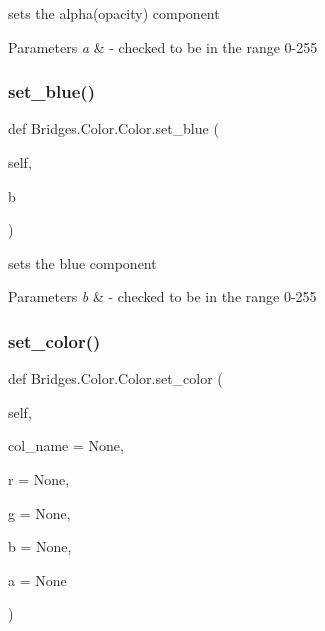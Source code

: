 sets the alpha(opacity) component 


\begin{DoxyParams}{Parameters}
{\em a} & -\/ checked to be in the range 0-\/255 \\
\hline
\end{DoxyParams}
\mbox{\label{class_bridges_1_1_color_1_1_color_a5b298c7b23b82e2599377ec79f199362}} 
\subsubsection{\texorpdfstring{set\+\_\+blue()}{set\_blue()}}
{\footnotesize\ttfamily def Bridges.\+Color.\+Color.\+set\+\_\+blue (\begin{DoxyParamCaption}\item[{}]{self,  }\item[{}]{b }\end{DoxyParamCaption})}



sets the blue component 


\begin{DoxyParams}{Parameters}
{\em b} & -\/ checked to be in the range 0-\/255 \\
\hline
\end{DoxyParams}
\mbox{\label{class_bridges_1_1_color_1_1_color_abb49cdb739a55e982a4080bfa761a701}} 
\subsubsection{\texorpdfstring{set\+\_\+color()}{set\_color()}}
{\footnotesize\ttfamily def Bridges.\+Color.\+Color.\+set\+\_\+color (\begin{DoxyParamCaption}\item[{}]{self,  }\item[{}]{col\+\_\+name = {\ttfamily None},  }\item[{}]{r = {\ttfamily None},  }\item[{}]{g = {\ttfamily None},  }\item[{}]{b = {\ttfamily None},  }\item[{}]{a = {\ttfamily None} }\end{DoxyParamCaption})}




